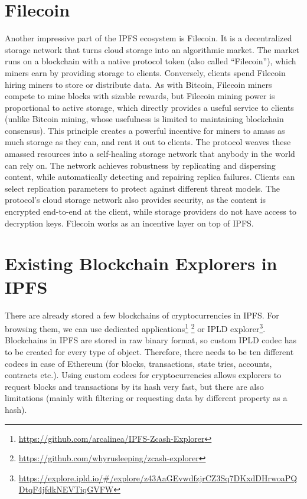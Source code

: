 \section{Filecoin}
Another impressive part of the IPFS ecosystem is Filecoin. It is a decentralized storage network that turns cloud storage into an algorithmic market. The market runs on a blockchain with a native protocol token (also called ``Filecoin''), which miners earn by providing storage to clients. Conversely, clients spend Filecoin hiring miners to store or distribute data. As with Bitcoin, Filecoin miners compete to mine blocks with sizable rewards, but Filecoin mining power is proportional to active storage, which directly provides a useful service to clients (unlike Bitcoin mining, whose usefulness is limited to maintaining blockchain consensus). This principle creates a powerful incentive for miners to amass as much storage as they can, and rent it out to clients. The protocol weaves these amassed resources into a self-healing storage network that anybody in the world can rely on. The network achieves robustness by replicating and dispersing content, while automatically detecting and repairing replica failures. Clients can select replication parameters to protect against different threat models. The protocol’s cloud storage network also provides security, as the content is encrypted end-to-end at the client, while storage providers do not have access to decryption keys. Filecoin works as an incentive layer on top of IPFS. \cite{filecoinWhitepaper}

\section{Existing Blockchain Explorers in IPFS}
There are already stored a few blockchains of cryptocurrencies in IPFS. For browsing them, we can use dedicated applications\footnote{\url{https://github.com/arcalinea/IPFS-Zcash-Explorer}} \footnote{\url{https://github.com/whyrusleeping/zcash-explorer}} or IPLD explorer\footnote{\url{https://explore.ipld.io/\#/explore/z43AaGEvwdfzjrCZ3Sq7DKxdDHrwoaPQDtqF4jfdkNEVTiqGVFW}}. Blockchains in IPFS are stored in raw binary format, so custom IPLD codec has to be created for every type of object. Therefore, there needs to be ten different codecs in case of Ethereum (for blocks, transactions, state tries, accounts, contracts etc.). Using custom codecs for cryptocurrencies allows explorers to request blocks and transactions by its hash very fast, but there are also limitations (mainly with filtering or requesting data by different property as a hash).

